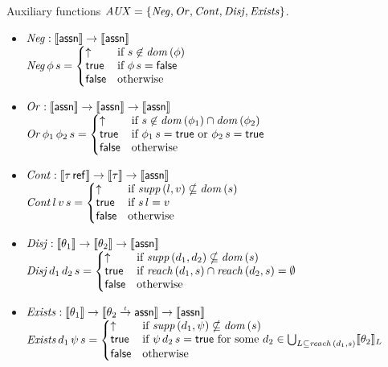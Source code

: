 \documentclass[12pt,a4paper]{report}
\newcommand{\AUX}{\nstyle{AUX}}
\newcommand{\Neg}{\nstyle{Neg}}
\newcommand{\Or}{\nstyle{Or}}
\newcommand{\Cont}{\nstyle{Cont}}
\newcommand{\Disj}{\nstyle{Disj}}
\newcommand{\Exists}{\nstyle{Exists}}
\begin{document}
\noindent Auxiliary functions $\AUX = \{\Neg,\Or,\Cont,\Disj,\Exists\}$.
\begin{itemize}
  \item $\Neg: \semantic{\tassn} \to \semantic{\tassn}$ \\[1ex]
        $\Neg\,\phi\,s =
          \bcase
            \uparrow  & \text{if } s \not\in \dom{\phi} \\
            \true     & \text{if } \phi\,s=\false \\
            \false    & \text{otherwise}
          \ecase$

  \item $\Or: \semantic{\tassn} \to \semantic{\tassn} \to \semantic{\tassn}$ \\[1ex]
        $\Or\,\phi_1\,\phi_2\,s =
          \bcase
            \uparrow  & \text{if } s \not\in \dom{\phi_1} \cap \dom{\phi_2} \\
            \true     & \text{if } \phi_1\,s=\true \text{ or } \phi_2\,s=\true \\
            \false    & \text{otherwise}
          \ecase$

  \item $\Cont: \semantic{\tref{\tau}} \to \semantic{\tau} \to \semantic{\tassn}$ \\[1ex]
        $\Cont\,l\,v\,s =
          \bcase
            \uparrow  & \text{if } \supp{l,v} \nsubseteq \dom{s} \\
            \true     & \text{if } s\,l = v \\
            \false    & \text{otherwise}
          \ecase$

  \item $\Disj: \semantic{\theta_1} \to \semantic{\theta_2} \to \semantic{\tassn}$ \\[1ex]
        $\Disj\,d_1\,d_2\,s =
          \bcase
            \uparrow  & \text{if } \supp{d_1,d_2} \nsubseteq \dom{s} \\
            \true     & \text{if } \reach{d_1}{s} \cap \reach{d_2}{s} = \emptyset \\
            \false    & \text{otherwise}
          \ecase$
  
  \item $\Exists: \semantic{\theta_1} \to \semantic{\ttarrow{\theta_2}{\tassn}} \to \semantic{\tassn}$ \\[1ex]
        $\Exists\,d_1\,\psi\,s =
          \bcase
            \uparrow  & \text{if } \supp{d_1,\psi} \nsubseteq \dom{s} \\
            \true     & \text{if } \psi\,d_2\,s = \true
                        \text{ for some } d_2 \in \bigcup_{L\subseteq\reach{d_1}{s}}\semantic{\theta_2}_{L} \\
            \false    & \text{otherwise}
          \ecase$
\end{itemize}
\end{document}
